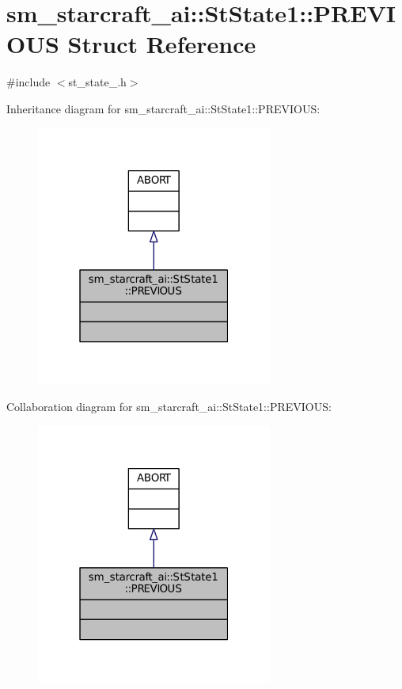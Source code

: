 \hypertarget{structsm__starcraft__ai_1_1StState1_1_1PREVIOUS}{}\section{sm\+\_\+starcraft\+\_\+ai\+:\+:St\+State1\+:\+:P\+R\+E\+V\+I\+O\+US Struct Reference}
\label{structsm__starcraft__ai_1_1StState1_1_1PREVIOUS}


{\ttfamily \#include $<$st\+\_\+state\+\_.\+h$>$}



Inheritance diagram for sm\+\_\+starcraft\+\_\+ai\+:\+:St\+State1\+:\+:P\+R\+E\+V\+I\+O\+US\+:
\nopagebreak
\begin{figure}[H]
\begin{center}
\leavevmode
\includegraphics[width=220pt]{structsm__starcraft__ai_1_1StState1_1_1PREVIOUS__inherit__graph}
\end{center}
\end{figure}


Collaboration diagram for sm\+\_\+starcraft\+\_\+ai\+:\+:St\+State1\+:\+:P\+R\+E\+V\+I\+O\+US\+:
\nopagebreak
\begin{figure}[H]
\begin{center}
\leavevmode
\includegraphics[width=220pt]{structsm__starcraft__ai_1_1StState1_1_1PREVIOUS__coll__graph}
\end{center}
\end{figure}



